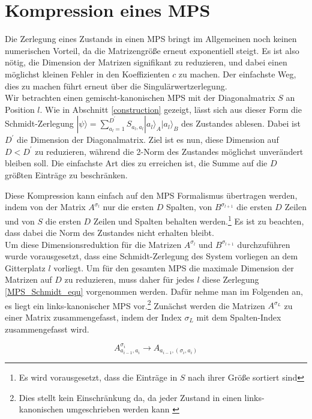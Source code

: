 \documentclass[10pt,a4paper]{report}
\begin{document}
\section{Kompression eines MPS}\label{compress}
Die Zerlegung eines Zustands in einen MPS bringt im Allgemeinen noch keinen numerischen Vorteil, da die Matrizengröße erneut exponentiell steigt. Es ist also nötig, die Dimension der Matrizen signifikant zu reduzieren, und dabei einen möglichst kleinen Fehler in den Koeffizienten $c$ zu machen. Der einfachste Weg, dies zu machen führt erneut über die Singulärwertzerlegung.\\


Wir betrachten einen gemischt-kanonischen MPS mit der Diagonalmatrix $S$ an Position $l$. Wie in Abschnitt \ref{construction} gezeigt, lässt sich aus dieser Form die Schmidt-Zerlegung $|\psi\rangle=\sum_{a_l=1}^{D^{\prime}} S_{a_l,a_l}|a_l\rangle_A|a_l\rangle_B$ des Zustandes ablesen. Dabei ist $D^\prime$ die Dimension der Diagonalmatrix. Ziel ist es nun, diese Dimension auf $D<D^\prime$ zu reduzieren, während die 2-Norm des Zustandes möglichst unverändert bleiben soll.
Die einfachste Art dies zu erreichen ist, die Summe auf die $D$ größten Einträge zu beschränken.


Diese Kompression kann einfach auf den MPS Formalismus übertragen werden, indem von der Matrix $A^{\sigma_l}$ nur die ersten $D$ Spalten, von $B^{\sigma_{l+1}}$ die ersten $D$ Zeilen und von $S$ die ersten $D$ Zeilen und Spalten behalten werden.\footnote{Es wird vorausgesetzt, dass die Einträge in $S$ nach ihrer Größe sortiert sind} Es ist zu beachten, dass dabei die Norm des Zustandes nicht erhalten bleibt.\\

Um diese Dimensionsreduktion für die Matrizen $A^{\sigma_l}$ und $B^{\sigma_{l+1}}$ durchzuführen wurde vorausgesetzt, dass eine Schmidt-Zerlegung des System vorliegen an dem Gitterplatz $l$ vorliegt. Um für den gesamten MPS die maximale Dimension der Matrizen auf $D$ zu reduzieren, muss daher für jedes $l$ diese Zerlegung \ref{MPS_Schmidt_equ} vorgenommen werden. Dafür nehme man im Folgenden an, es liegt ein links-kanonischer MPS vor.\footnote{Dies stellt kein Einschränkung da, da jeder Zustand in einen links-kanonischen umgeschrieben werden kann \cite[Seite~129]{MPS-main}} Zunächst werden die Matrizen $A^{\sigma_L}$ zu einer Matrix zusammengefasst, indem der Index $\sigma_L$ mit dem Spalten-Index zusammengefasst wird.

\begin{equation}
A_{a_{i-1},a_i}^{\sigma_i}\rightarrow A_{a_{i-1},(\sigma_i,a_i)}
\end{equation}
\end{document}
